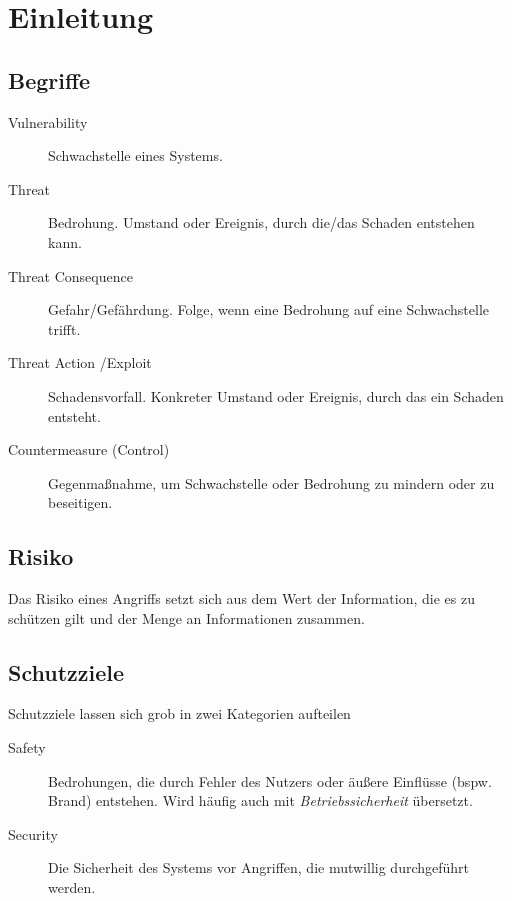 \chapter{Einleitung} %
    \begin{figure}[H]
    	\centering
    \end{figure}

    \section{Begriffe}
        \begin{description}
        	\item[Vulnerability] Schwachstelle eines Systems.
        	\item[Threat] Bedrohung. Umstand oder Ereignis, durch die/das Schaden entstehen kann.
        	\item[Threat Consequence] Gefahr/Gefährdung. Folge, wenn eine Bedrohung auf eine Schwachstelle trifft.
        	\item[Threat Action /Exploit] Schadensvorfall. Konkreter Umstand oder Ereignis, durch das ein Schaden entsteht.
        	\item[Countermeasure (Control)] Gegenmaßnahme, um Schwachstelle oder Bedrohung zu mindern oder zu beseitigen.
        \end{description}

    \section{Risiko}
        Das Risiko eines Angriffs setzt sich aus dem Wert der Information, die es zu schützen gilt und der Menge an Informationen zusammen.

    \section{Schutzziele}
        Schutzziele lassen sich grob in zwei Kategorien aufteilen
        \begin{description}
        	\item[Safety] Bedrohungen, die durch Fehler des Nutzers oder äußere Einflüsse (bspw. Brand) entstehen. Wird häufig auch mit \textit{Betriebssicherheit} übersetzt.
        	\item[Security] Die Sicherheit des Systems vor Angriffen, die mutwillig durchgeführt werden.
        \end{description}

